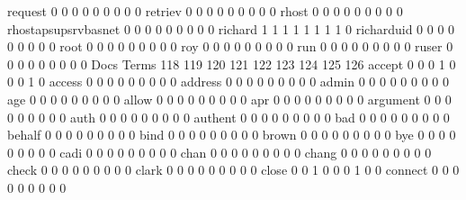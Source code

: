 \documentclass[compress,8pt]{beamer}
\begin{document}
\begin{frame}
\begin{Schunk}
  request                                    0   0   0   0   0   0   0   0   0
  retriev                                    0   0   0   0   0   0   0   0   0
  rhost                                      0   0   0   0   0   0   0   0   0
  rhostapsupsrvbasnet                        0   0   0   0   0   0   0   0   0
  richard                                    1   1   1   1   1   1   1   1   0
  richarduid                                 0   0   0   0   0   0   0   0   0
  root                                       0   0   0   0   0   0   0   0   0
  roy                                        0   0   0   0   0   0   0   0   0
  run                                        0   0   0   0   0   0   0   0   0
  ruser                                      0   0   0   0   0   0   0   0   0
                                          Docs
Terms                                      118 119 120 121 122 123 124 125 126
  accept                                     0   0   0   1   0   0   0   1   0
  access                                     0   0   0   0   0   0   0   0   0
  address                                    0   0   0   0   0   0   0   0   0
  admin                                      0   0   0   0   0   0   0   0   0
  age                                        0   0   0   0   0   0   0   0   0
  allow                                      0   0   0   0   0   0   0   0   0
  apr                                        0   0   0   0   0   0   0   0   0
  argument                                   0   0   0   0   0   0   0   0   0
  auth                                       0   0   0   0   0   0   0   0   0
  authent                                    0   0   0   0   0   0   0   0   0
  bad                                        0   0   0   0   0   0   0   0   0
  behalf                                     0   0   0   0   0   0   0   0   0
  bind                                       0   0   0   0   0   0   0   0   0
  brown                                      0   0   0   0   0   0   0   0   0
  bye                                        0   0   0   0   0   0   0   0   0
  cadi                                       0   0   0   0   0   0   0   0   0
  chan                                       0   0   0   0   0   0   0   0   0
  chang                                      0   0   0   0   0   0   0   0   0
  check                                      0   0   0   0   0   0   0   0   0
  clark                                      0   0   0   0   0   0   0   0   0
  close                                      0   0   1   0   0   0   1   0   0
  connect                                    0   0   0   0   0   0   0   0   0

\end{Schunk}
\end{frame}
\end{document}
